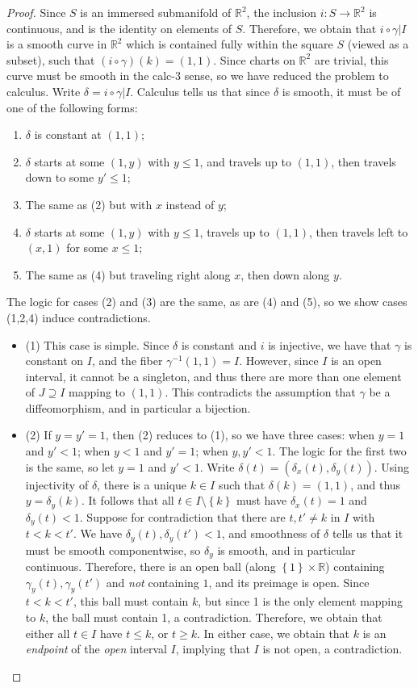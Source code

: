 \documentclass[11pt, letterpaper]{article}
\theoremstyle{plain}
\begin{document}
\begin{proof}
	Since $S$ is an immersed submanifold of $\mathbb{R} ^2$, the inclusion $i : S \to \mathbb{R} ^2$ is continuous, and is the identity on elements of $S$. Therefore, we obtain that $i\circ \gamma|I $ is a smooth curve in $\mathbb{R} ^2$ which is contained fully within the square $S$ (viewed as a subset), such that $(i\circ \gamma )(k)=(1,1)$. Since charts on $\mathbb{R} ^2$ are trivial, this curve must be smooth in the calc-3 sense, so we have reduced the problem to calculus. Write $\delta =i\circ \gamma |I$. Calculus tells us that since $\delta $ is smooth, it must be of one of the following forms:
	\begin{enumerate}
		\item $\delta $ is constant at $(1,1)$;
		\item $\delta $ starts at some $(1,y)$ with $y\leq 1$, and travels up to $(1,1)$, then travels down to some $y'\leq 1$;
		\item The same as (2) but with $x$ instead of $y$;
		\item $\delta $ starts at some $(1,y)$ with $y\leq 1$, travels up to $(1,1)$, then travels left to $(x,1)$ for some $x\leq 1$;
		\item The same as (4) but traveling right along $x$, then down along $y$.
	\end{enumerate}
	The logic for cases (2) and (3) are the same, as are (4) and (5), so we show cases (1,2,4) induce contradictions.
	\begin{itemize}
		\item (1) This case is simple. Since $\delta $ is constant and $i$ is injective, we have that $\gamma $ is constant on $I$, and the fiber $\gamma ^{-1} (1,1)=I$. However, since $I$ is an open interval, it cannot be a singleton, and thus there are more than one element of $J\supseteq I$ mapping to $(1,1)$.  This contradicts the assumption that $\gamma $ be a diffeomorphism, and in particular a bijection.
		\item (2) If $y=y'=1$, then (2) reduces to (1), so we have three cases: when $y=1$ and $y'<1$; when $y<1$ and $y'=1$; when $y,y'<1$. The logic for the first two is the same, so let $y=1$ and $y'<1$. Write $\delta (t)=(\delta _x(t),\delta _y(t))$. Using injectivity of $\delta $, there is a unique $k\in I$ such that $\delta (k)=(1,1)$, and thus $y=\delta _y(k)$. It follows that all $t\in I\setminus \left\{ k \right\} $ must have $\delta _x(t)=1$ and $\delta _y(t)<1$. Suppose for contradiction that there are $t,t'\neq k$ in $I$ with $t<k<t'$. We have $\delta _y(t),\delta _y(t')<1$, and smoothness of $\delta $ tells us that it must be smooth componentwise, so $\delta _y$ is smooth, and in particular continuous. Therefore, there is an open ball (along $\left\{ 1 \right\} \times \mathbb{R} $) containing $\gamma _y(t),\gamma _y(t')$ and \emph{not} containing $1$, and its preimage is open. Since $t<k<t'$, this ball must contain $k$, but since 1 is the only element mapping to $k$, the ball must contain 1, a contradiction. Therefore, we obtain that either all $t\in I$ have $t\leq k$, or $t \geq k$. In either case, we obtain that $k$ is an \emph{endpoint} of the \emph{open} interval $I$, implying that $I$ is not open, a contradiction.


\end{itemize}
\end{proof}
\end{document}
